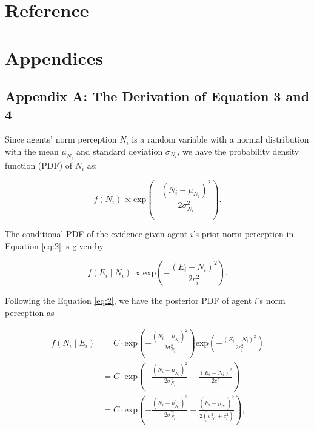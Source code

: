 \documentclass[
  11pt,
]{article}
\begin{document}
\newpage

\hypertarget{reference}{%
\section*{Reference}\label{reference}}

\newpage

\hypertarget{appendices}{%
\section*{Appendices}\label{appendices}}

\hypertarget{appendix-a-the-derivation-of-equation-3-and-4}{%
\subsection*{Appendix A: The Derivation of Equation 3 and
4}\label{appendix-a-the-derivation-of-equation-3-and-4}}

Since agents' norm perception \(N_i\) is a random variable with a normal
distribution with the mean \(\mu_{N_i}\) and standard deviation
\(\sigma_{N_i}\), we have the probability density function (PDF) of
\(N_i\) as:

\begin{equation*}
f(N_i) \propto \text{exp}(-\frac{(N_i - \mu_{N_i})^2}{2\sigma_{N_i}^2}).
\end{equation*}

The conditional PDF of the evidence given agent \(i\)'s prior norm
perception in Equation \ref{eq:2} is given by

\begin{equation*}
f(E_i \mid N_i) \propto \text{exp}(-\frac{(E_i - N_i)^2}{2c_i^2}).
\end{equation*}

Following the Equation \ref{eq:2}, we have the posterior PDF of agent
\(i\)'s norm perception as

\begin{equation*}
  \begin{aligned}
    f(N_i \mid E_i) &= C \cdot \text{exp}(-\frac{(N_i - \mu_{N_i})^2}{2\sigma_{N_i}^2}) \text{exp}(- \frac{(E_i - N_i)^2}{2c_i^2})\\
      &= C \cdot \text{exp}(-\frac{(N_i - \mu_{N_i})^2}{2\sigma_{N_i}^2} - \frac{(E_i - N_i)^2}{2c_i^2})\\
      &= C \cdot \text{exp}(- \frac{(N_i - \mu_{N_i}^{\prime})^2}{2\sigma_{N_i}^{\prime2}} - \frac{(E_i - \mu_{N_i})^2}{2(\sigma_{N_i}^2 + c_i^2)}),
  \end{aligned}
\end{equation*}
\end{document}
